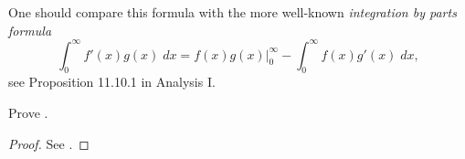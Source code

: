 \begin{rmk}\label{ii:4.3.3}
  One should compare this formula with the more well-known \emph{integration by parts formula}
  \[
    \int_0^\infty f'(x) g(x) \; dx = f(x) g(x) |_0^\infty - \int_0^\infty f(x) g'(x) \; dx,
  \]
  see Proposition 11.10.1 in Analysis I.
\end{rmk}

\exercisesection

\begin{ex}\label{ii:ex:4.3.1}
  Prove .
\end{ex}

\begin{proof}
  See .
\end{proof}
